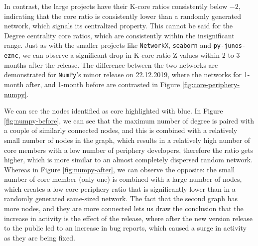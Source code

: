 In contrast, the large projects have their K-core ratios consistently below $-2$, indicating that the core ratio is consistently lower than a randomly generated network, which signals its centralized property. This cannot be said for the Degree centrality core ratios, which are consistently within the insignificant range. Just as with the smaller projects like \texttt{NetworkX}, \texttt{seaborn} and \texttt{py-junos-eznc}, we can observe a significant drop in K-core ratio Z-values within 2 to 3 months after the release. The difference between the two networks are demonstrated for \texttt{NumPy}'s minor release on 22.12.2019, where the networks for 1-month after, and 1-month before are contrasted in Figure \ref{fig:core-periphery-numpy}.

We can see the nodes identified as core highlighted with blue. In Figure \ref{fig:numpy-before}, we can see that the maximum number of degree is paired with a couple of similarly connected nodes, and this is combined with a relatively small number of nodes in the graph, which results in a relatively high number of core members with a low number of periphery developers, therefore the ratio gets higher, which is more similar to an almost completely dispersed random network. Whereas in Figure \ref{fig:numpy-after}, we can observe the opposite: the small number of core member (only one) is combined with a large number of nodes, which creates a low core-periphery ratio that is significantly lower than in a randomly generated same-sized network. The fact that the second graph has more nodes, and they are more connected lets us draw the conclusion that the increase in activity is the effect of the release, where after the new version release to the public led to an increase in bug reports, which caused a surge in activity as they are being fixed.

